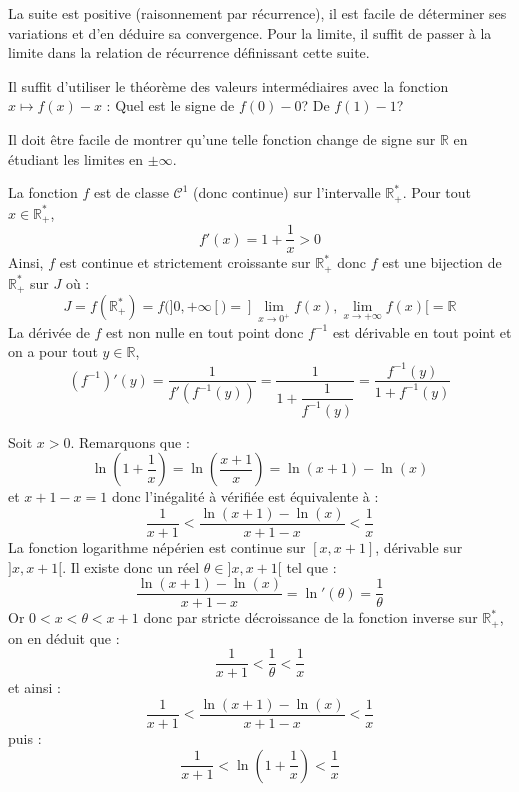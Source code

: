 \documentclass[a4paper,twoside,french,11pt]{VcCours}
\begin{document}
\begin{Exercice}{}\end{Exercice}La suite est positive (raisonnement par récurrence), il est facile de déterminer ses variations et d'en déduire sa convergence. Pour la limite, il suffit de passer à la limite dans la relation de récurrence définissant cette suite.



\begin{Exercice}{}\end{Exercice}Il suffit d'utiliser le théorème des valeurs intermédiaires avec la fonction $x \mapsto f(x)-x$ : Quel est le signe de $f(0)-0$? De $f(1)-1$?



\begin{Exercice}{}\end{Exercice}Il doit être facile de montrer qu'une telle fonction change de signe sur $\mathbb{R}$ en étudiant les limites en $ \pm \infty$.



\begin{Exercice}{}\end{Exercice}La fonction $f$ est de classe $\mathcal{C}^1$ (donc continue) sur l'intervalle $\mathbb{R}_+^{*}$. Pour tout $x \in \mathbb{R}_+^{*}$,
$$ f'(x) = 1 + \dfrac{1}{x}>0$$
Ainsi, $f$ est continue et strictement croissante sur $\mathbb{R}_+^{*}$ donc $f$ est une bijection de $\mathbb{R}_+^{*}$ sur $J$ où :
$$ J = f(\mathbb{R}_+^{*}) = f(]0, + \infty[) = ]\lim_{x \rightarrow 0^+} f(x), \lim_{x \rightarrow + \infty} f(x)[ = \mathbb{R}$$
La dérivée de $f$ est non nulle en tout point donc $f^{-1}$ est dérivable en tout point et on a pour tout $y \in \mathbb{R}$,
$$ (f^{-1})'(y) = \dfrac{1}{f'(f^{-1}(y))}= \dfrac{1}{1+ \dfrac{1}{f^{-1}(y)}} = \dfrac{f^{-1}(y)}{1+f^{-1}(y)}$$


\begin{Exercice}{}\end{Exercice}Soit $x>0$. Remarquons que :
$$ \ln \left( 1 + \dfrac{1}{x} \right) = \ln \left(\dfrac{x+1}{x} \right)= \ln(x+1)-\ln(x)$$
et $x+1-x=1$ donc l'inégalité à vérifiée est équivalente à :
$$ \dfrac{1}{x+1} < \dfrac{\ln(x+1)-\ln(x)}{x+1-x} < \dfrac{1}{x}$$
La fonction logarithme népérien est continue sur $[x,x+1]$, dérivable sur $]x,x+1[$. Il existe donc un réel $\theta \in ]x,x+1[$ tel que :
$$ \dfrac{\ln(x+1)-\ln(x)}{x+1-x} = \ln'(\theta) = \dfrac{1}{\theta}$$
Or $0<x< \theta< x+1$ donc par stricte décroissance de la fonction inverse sur $\mathbb{R}_+^{*}$, on en déduit que :
$$ \dfrac{1}{x+1}< \dfrac{1}{\theta} < \dfrac{1}{x}$$
et ainsi :
$$ \dfrac{1}{x+1} < \dfrac{\ln(x+1)-\ln(x)}{x+1-x} < \dfrac{1}{x}$$
puis :
$$ \dfrac{1}{x+1} < \ln \left( 1 + \dfrac{1}{x} \right) < \dfrac{1}{x}$$
\end{document}
